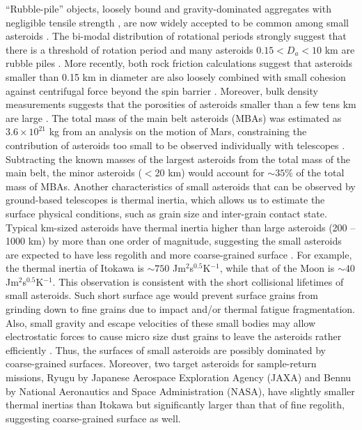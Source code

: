\documentclass[3p,authoryear]{elsarticle}
\begin{document}
``Rubble-pile'' objects,  loosely bound and gravity-dominated aggregates with negligible tensile strength \citep[e.g.][]{fujiwara1980}, are now
widely accepted to be common among small asteroids \citep[e.g.][]{richardson2002}. The bi-modal distribution of rotational periods strongly suggest
that there is a threshold of rotation period and many asteroids $0.15<D_a<10$ km are rubble piles \citep{pravec2002}. More recently, both rock
friction calculations suggest that asteroids smaller than 0.15 km in diameter are also loosely combined with small cohesion against
centrifugal force beyond the spin barrier \citep[e.g.][]{holsapple2007,scheeres2010,rozitis2014}. Moreover, bulk density measurements suggests that the porosities of asteroids smaller
than a few tens km are large \citep{britt2002}. The total mass of the main belt asteroids (MBAs) was estimated as $3.6\times 10^{21}$ kg from an
analysis on the motion of Mars, constraining the contribution of asteroids too small to be observed individually with telescopes \citep{krasinsky2002}.
Subtracting the known masses of the largest asteroids \citep{demeo2014} from the total mass of the main belt, the minor asteroids ($<$20 km) would account for $\sim 35 \%$ of the total mass of MBAs. Another characteristics of small asteroids that can be observed by ground-based telescopes is thermal
inertia, which allows us to estimate the surface physical conditions, such as grain size and inter-grain contact state. Typical km-sized asteroids
have thermal inertia higher than large asteroids (200 -- 1000 km) by more than one order of magnitude, suggesting the small asteroids are
expected to have less regolith and more coarse-grained surface \citep{delbo2009}. For example, the thermal inertia of Itokawa is $\sim 750$ Jm$^2$s$^{0.5}$K$^{-1}$\citep{muller2005}, while that of the Moon is $\sim 40$ Jm$^2$s$^{0.5}$K$^{-1}$\citep{Keihm1984}.
This observation is consistent with the short collisional lifetimes of small asteroids. 
Such short surface age would prevent surface grains from grinding down to fine grains due to impact and/or thermal fatigue fragmentation.
Also, small gravity and escape velocities of these small bodies may allow electrostatic forces to cause micro size dust grains to leave the asteroids rather efficiently \citep{lee1996,hartzell2011,nagao2011}.
Thus, the surfaces of small asteroids are possibly dominated by coarse-grained surfaces.
Moreover, two target asteroids for sample-return missions, Ryugu by Japanese Aerospace Exploration Agency (JAXA) and Bennu by National Aeronautics
and Space Administration (NASA), have slightly smaller thermal inertias \citep{emery2014, hasegawa2008} than Itokawa but significantly larger than
that of fine regolith, suggesting coarse-grained surface as well.
\end{document}
